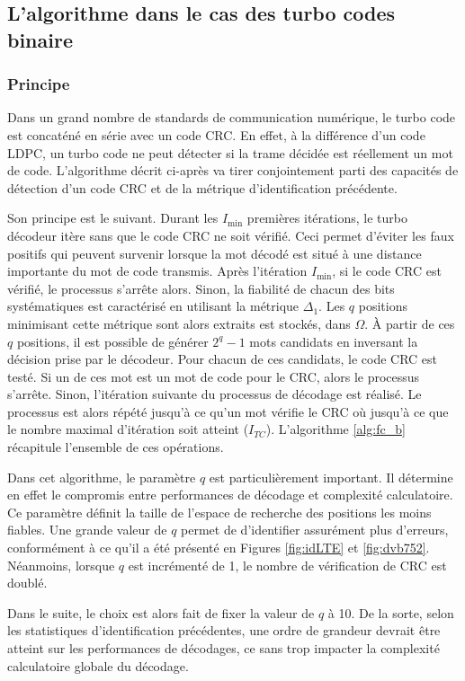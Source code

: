 \subsection{L'algorithme dans le cas des turbo codes binaire}

\subsubsection{Principe}
Dans un grand nombre de standards de communication numérique, le turbo code est concaténé en série avec un code CRC. En 
effet, à la différence d'un code LDPC, un turbo code ne peut détecter si la trame décidée est réellement un mot de code. 
L'algorithme  décrit ci-après va tirer conjointement parti des capacités de détection d'un code CRC et de la métrique 
d'identification précédente. 

Son principe est le suivant. Durant les $I_{\text{min}}$ premières itérations, le turbo décodeur itère sans que le code
CRC ne soit vérifié. Ceci permet d'éviter les faux positifs qui peuvent survenir lorsque la mot décodé est situé à une 
distance importante du mot de code transmis. Après l'itération $I_{\text{min}}$, si le code CRC est vérifié, le processus
s'arrête alors. Sinon, la fiabilité de chacun des bits systématiques est caractérisé en utilisant la métrique $\Delta_1$.
Les $q$ positions minimisant cette métrique sont alors extraits est stockés, dans $\Omega$. À partir de ces $q$ positions,
il est possible de générer $2^q-1$ mots candidats en inversant la décision prise par le décodeur. Pour chacun de ces 
candidats, le code CRC est testé. Si un de ces mot est un mot de code pour le CRC, alors le processus s'arrête. Sinon, 
l'itération suivante du processus de décodage est réalisé. Le processus est alors répété jusqu'à ce qu'un mot vérifie le 
CRC où jusqu'à ce que le nombre maximal d'itération soit atteint ($I_{TC}$). L'algorithme \ref{alg:fc_b} récapitule l'ensemble de 
ces opérations.

Dans cet algorithme, le paramètre $q$ est particulièrement important. Il détermine en effet le compromis entre performances
de décodage et complexité calculatoire. Ce paramètre définit la taille de l'espace de recherche des positions les moins
fiables. Une grande valeur de $q$ permet de d'identifier assurément plus d'erreurs, conformément à ce qu'il a été
présenté en Figures \ref{fig:idLTE} et \ref{fig:dvb752}. Néanmoins, lorsque $q$ est incrémenté de 1, le nombre de 
vérification de CRC est doublé.

Dans le suite, le choix est alors fait de fixer la valeur de $q$ à 10. De la sorte, selon les statistiques d'identification 
précédentes, une ordre de grandeur devrait être atteint sur les performances de décodages, ce sans trop impacter la complexité
calculatoire globale du décodage.


